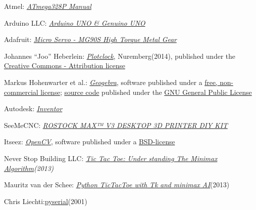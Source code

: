 \documentclass{sig-alternate-05-2015}
\begin{document}
\begin{thebibliography}{Atm}
	
	Atmel: \emph{\href{https://cdn.sparkfun.com/datasheets/Kits/doc8161.pdf.}{ATmega328P Manual}}
	
	{Arduino LLC:
	\emph{\href{https://www.arduino.cc/en/Main/ArduinoBoardUno}{Arduino UNO \& Genuino UNO}}}
	
	Adafruit: \emph{\href{https://www.adafruit.com/products/1143}{Micro Servo - MG90S High Torque Metal Gear}}
	
	Johannes ``Joo'' Heberlein: \emph{\href{http://www.thingiverse.com/thing:248009}{Plotclock}}, Nuremberg(2014), published under the \href{https://creativecommons.org/licenses/by/3.0/}{Creative Commons - Attribution license}
	
	Markus Hohenwarter et al.: \emph{\href{geogebra.org}{Geogebra}}, software published under a \href{https://www.geogebra.org/license}{free, non-commercial license}; \href{https://dev.geogebra.org/trac}{source code} published under the \href{http://www.gnu.org/licenses/gpl.html}{GNU General Public License}
	
	Autodesk: \emph{\href{http://www.autodesk.de/products/inventor/overview}{Inventor}}
	
	SeeMeCNC: \emph{\href{https://www.seemecnc.com/products/rostock-max-v3-desktop-3d-printer-diy-kit}{ROSTOCK MAX™ V3 DESKTOP 3D PRINTER DIY KIT}}
	
	Itseez: \emph{\href{http://opencv.org}{OpenCV}}, software published under a \href{http://opencv.org/about.html}{BSD-license}
	
	{Never Stop Building LLC}: \emph{\href{http://neverstopbuilding.com/minimax}{Tic Tac Toe: Under standing The Minimax Algorithm}(2013)}
	
	Mauritz van der Schee: \emph{\href{https://www.leaseweb.com/labs/2013/12/python-tictactoe-tk-minimax-ai/}{Python TicTacToe with Tk and minimax AI}}(2013)
	
	Chris Liechti:\href{https://pythonhosted.org/pyserial/}{pyserial}(2001)
	
\end{thebibliography}
\end{document}
